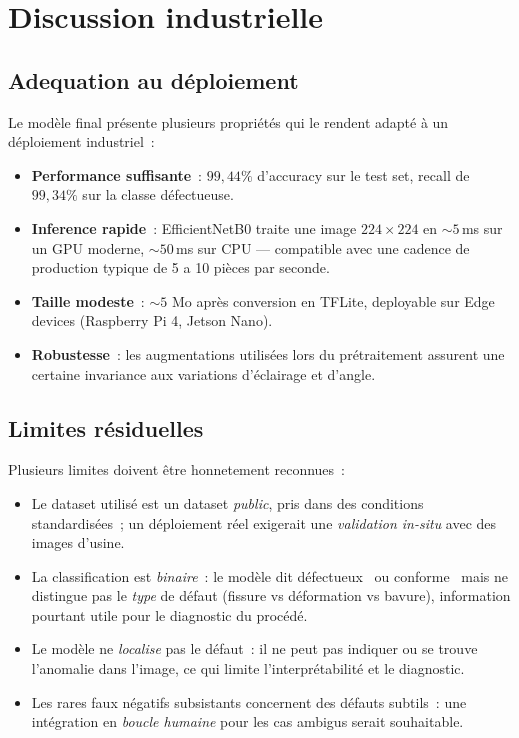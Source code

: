 \section{Discussion industrielle}

\subsection{Adequation au déploiement}

Le modèle final présente plusieurs propriétés qui le rendent adapté à un déploiement industriel~:
\begin{itemize}
    \item \textbf{Performance suffisante}~: $99{,}44\%$ d'accuracy sur le test set, recall de $99{,}34\%$ sur la classe défectueuse.
    \item \textbf{Inference rapide}~: EfficientNetB0 traite une image $224\times224$ en $\sim 5$\,ms sur un GPU moderne, $\sim 50$\,ms sur CPU --- compatible avec une cadence de production typique de 5 a 10 pièces par seconde.
    \item \textbf{Taille modeste}~: $\sim 5$ Mo après conversion en TFLite, deployable sur Edge devices (Raspberry Pi 4, Jetson Nano).
    \item \textbf{Robustesse}~: les augmentations utilisées lors du prétraitement assurent une certaine invariance aux variations d'éclairage et d'angle.
\end{itemize}

\subsection{Limites résiduelles}

Plusieurs limites doivent être honnetement reconnues~:
\begin{itemize}
    \item Le dataset utilisé est un dataset \emph{public}, pris dans des conditions standardisées~; un déploiement réel exigerait une \emph{validation in-situ} avec des images d'usine.
    \item La classification est \emph{binaire}~: le modèle dit \og défectueux \fg\ ou \og conforme \fg\ mais ne distingue pas le \emph{type} de défaut (fissure vs déformation vs bavure), information pourtant utile pour le diagnostic du procédé.
    \item Le modèle ne \emph{localise} pas le défaut~: il ne peut pas indiquer ou se trouve l'anomalie dans l'image, ce qui limite l'interprétabilité et le diagnostic.
    \item Les rares faux négatifs subsistants concernent des défauts subtils~: une intégration en \emph{boucle humaine} pour les cas ambigus serait souhaitable.
\end{itemize}

